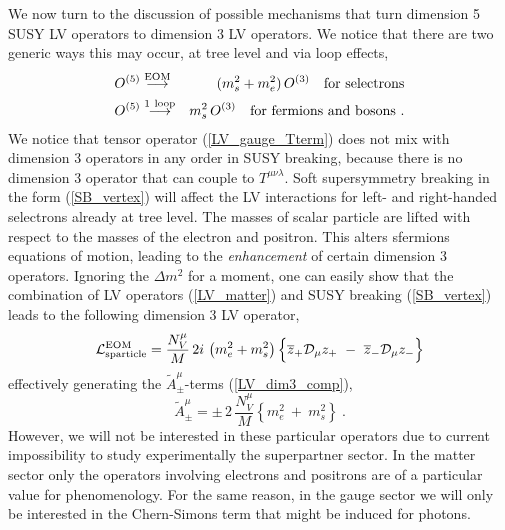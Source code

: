 \documentclass[12pt]{revtex4}
\begin{document}
We now turn to the discussion of possible mechanisms that turn dimension 5 SUSY LV operators
 to dimension 3 LV operators. We notice that there are two generic ways this 
may occur, at tree level and via loop effects, 
\begin{eqnarray*}
\nonumber
O^{(5)} & \stackrel{\mathrm {EOM}}{\longrightarrow} &
  (m_{s}^2 + m_e^2)\, O^{(3)}~~~{\rm for~selectrons}\\
\nonumber
O^{(5)} & \stackrel{\mathrm {1\ loop}}{\longrightarrow} &
  m_{s}^2\, O^{(3)} ~~~{\rm for~fermions ~and ~bosons}
~.
\end{eqnarray*}
	We notice that tensor operator (\ref{LV_gauge_Tterm}) does not
	mix with dimension 3 operators in any order in SUSY breaking, because there
	is no dimension 3 operator that can couple to $T^{\mu\nu\lambda}$.
Soft supersymmetry
breaking in the form (\ref{SB_vertex}) will affect the
LV interactions for left- and right-handed selectrons already at tree level.
The  masses of scalar particle are lifted with
respect to the masses of the electron and positron. 
This alters sfermions equations of motion, leading to the 
{\em enhancement} of certain dimension 3 operators. Ignoring 
the $\Delta m^2$ for a moment, one can easily show that the 
combination of LV operators (\ref{LV_matter}) and 
SUSY breaking (\ref{SB_vertex}) leads to the 
following dimension 3 LV operator,
\begin{equation}
  \mathcal{L}_{\rm sparticle}^{\rm EOM} = 
\frac{N_V^\mu}{M}\, 2 i\, 
\left(
m_e^2 + m_s^2
\right)
\Bigl\{ 
\overline{z}_+ \mathcal{D}_\mu z_+ 
~-~
\overline{z}_- \mathcal{D}_\mu z_- 
\Bigr\}
\end{equation}
effectively  generating the $ \widetilde{A}^\mu_\pm $-terms (\ref{LV_dim3_comp}),
 \begin{equation}
\widetilde{A}_\pm^\mu = 
\pm\, 2\, \frac{N_V^\mu}
                        { M }   
\left\{
m_e^2 ~+~ m_s^2
\right\}~.
\end{equation}
However, we will not be interested in these particular operators 
due to current impossibility to study experimentally  the superpartner sector. 
In the matter sector only the operators involving electrons and positrons are 
of a particular value for phenomenology.  
For the same reason, in the gauge sector we will only be interested
in the Chern-Simons term that might be induced for photons.
\end{document}
